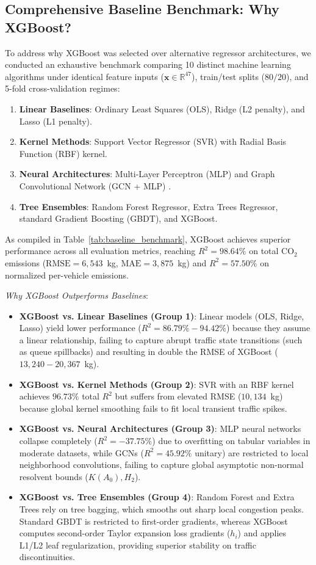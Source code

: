 \documentclass[lettersize,journal]{IEEEtran}
\begin{document}
\subsection{Comprehensive Baseline Benchmark: Why XGBoost?}
To address why XGBoost was selected over alternative regressor architectures, we conducted an exhaustive benchmark comparing 10 distinct machine learning algorithms under identical feature inputs ($\mathbf{x} \in \mathbb{R}^{47}$), train/test splits ($80/20$), and 5-fold cross-validation regimes:
\begin{enumerate}
    \item \textbf{Linear Baselines}: Ordinary Least Squares (OLS), Ridge (L2 penalty), and Lasso (L1 penalty).
    \item \textbf{Kernel Methods}: Support Vector Regressor (SVR) with Radial Basis Function (RBF) kernel.
    \item \textbf{Neural Architectures}: Multi-Layer Perceptron (MLP) and Graph Convolutional Network (GCN + MLP) \cite{Kipf2017}.
    \item \textbf{Tree Ensembles}: Random Forest Regressor, Extra Trees Regressor, standard Gradient Boosting (GBDT), and XGBoost.
\end{enumerate}

As compiled in Table~\ref{tab:baseline_benchmark}, XGBoost achieves superior performance across all evaluation metrics, reaching $R^2 = 98.64\%$ on total $\text{CO}_2$ emissions ($\text{RMSE} = 6,543$~kg, $\text{MAE} = 3,875$~kg) and $R^2 = 57.50\%$ on normalized per-vehicle emissions.

\textit{Why XGBoost Outperforms Baselines}:
\begin{itemize}
    \item \textbf{XGBoost vs. Linear Baselines (Group 1)}: Linear models (OLS, Ridge, Lasso) yield lower performance ($R^2 = 86.79\% - 94.42\%$) because they assume a linear relationship, failing to capture abrupt traffic state transitions (such as queue spillbacks) and resulting in double the RMSE of XGBoost ($13,240 - 20,367$~kg).
    \item \textbf{XGBoost vs. Kernel Methods (Group 2)}: SVR with an RBF kernel achieves $96.73\%$ total $R^2$ but suffers from elevated RMSE ($10,134$~kg) because global kernel smoothing fails to fit local transient traffic spikes.
    \item \textbf{XGBoost vs. Neural Architectures (Group 3)}: MLP neural networks collapse completely ($R^2 = -37.75\%$) due to overfitting on tabular variables in moderate datasets, while GCNs ($R^2 = 45.92\%$ unitary) are restricted to local neighborhood convolutions, failing to capture global asymptotic non-normal resolvent bounds ($K(A_0), H_2$).
    \item \textbf{XGBoost vs. Tree Ensembles (Group 4)}: Random Forest and Extra Trees rely on tree bagging, which smooths out sharp local congestion peaks. Standard GBDT is restricted to first-order gradients, whereas XGBoost computes second-order Taylor expansion loss gradients ($h_i$) and applies L1/L2 leaf regularization, providing superior stability on traffic discontinuities.
\end{itemize}
\end{document}
